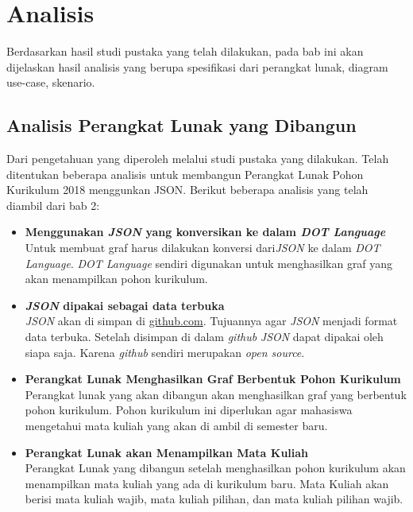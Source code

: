 \chapter{Analisis}
\label{chap: Analsisis}

Berdasarkan hasil studi pustaka yang telah dilakukan, pada bab ini akan dijelaskan hasil analisis
yang berupa spesifikasi dari perangkat lunak, diagram use-case, skenario.

\section{Analisis Perangkat Lunak yang Dibangun}
\label{sec: Analisis Perangkat Lunak yang Dibangun}
Dari pengetahuan yang diperoleh melalui studi pustaka yang dilakukan. Telah ditentukan beberapa analisis untuk membangun Perangkat Lunak Pohon Kurikulum 2018 menggunkan JSON. Berikut beberapa analisis yang telah diambil dari bab 2: 
\begin{itemize}
\item \textbf{Menggunakan \textit{JSON} yang konversikan ke dalam \textit{DOT Language}}\\
Untuk membuat graf harus dilakukan konversi dari\textit{JSON} ke dalam \textit{DOT Language}. \textit{DOT Language} sendiri digunakan untuk menghasilkan graf yang akan menampilkan pohon kurikulum. 

\item \textbf{\textit{JSON} dipakai sebagai data terbuka}\\
\textit{JSON} akan di simpan di \url{github.com}. Tujuannya agar \textit{JSON} menjadi format data terbuka. Setelah disimpan di dalam \textit{github} \textit{JSON} dapat dipakai oleh siapa saja. Karena \textit{github} sendiri merupakan \textit{open source}.

\item \textbf{Perangkat Lunak Menghasilkan Graf Berbentuk Pohon Kurikulum}\\
Perangkat lunak yang akan dibangun akan menghasilkan graf yang berbentuk pohon kurikulum. Pohon kurikulum ini diperlukan agar mahasiswa mengetahui mata kuliah yang akan di ambil di semester baru. 

\item \textbf{Perangkat Lunak akan Menampilkan Mata Kuliah}\\
Perangkat Lunak yang dibangun setelah menghasilkan pohon kurikulum akan menampilkan mata kuliah yang ada di kurikulum baru. Mata Kuliah akan berisi mata kuliah wajib, mata kuliah pilihan, dan mata kuliah pilihan wajib.
\end{itemize}

